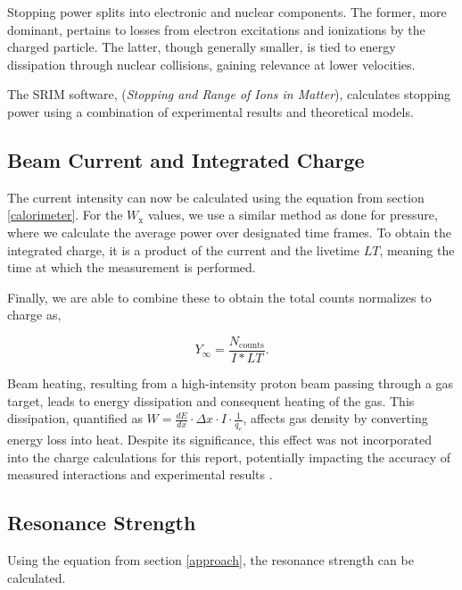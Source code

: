 \documentclass[a4paper,12pt]{article}
\begin{document}
Stopping power splits into electronic and nuclear components. The former, more dominant, pertains to losses from electron excitations and ionizations by the charged particle. The latter, though generally smaller, is tied to energy dissipation through nuclear collisions, gaining relevance at lower velocities.

The SRIM software, (\textit{Stopping and Range of Ions in Matter}), calculates stopping power using a combination of experimental results and theoretical models.


\subsection{Beam Current and Integrated Charge}

The current intensity can now be calculated using the equation from section \ref{calorimeter}.  For the $W_{\text{x}}$ values, we use a similar method as done for pressure, where we calculate the average power over designated time frames.  To obtain the integrated charge, it is a product of the current and the livetime $LT$, meaning the time at which the measurement is performed.  

Finally, we are able to combine these to obtain the total counts normalizes to charge as,

\begin{equation}
    Y_{\infty}=\frac{N_{\text{counts}}}{I*LT}.
\end{equation}

Beam heating, resulting from a high-intensity proton beam passing through a gas target, leads to energy dissipation and consequent heating of the gas. This dissipation, quantified as \(W = \frac{dE}{dx} \cdot \Delta x \cdot I \cdot \frac{1}{q_e}\), affects gas density by converting energy loss into heat. Despite its significance, this effect was not incorporated into the charge calculations for this report, potentially impacting the accuracy of measured interactions and experimental results \cite{GORRES1980295, cavanna2015}.



\subsection{Resonance Strength}

Using the equation from section \ref{approach}, the resonance strength can be calculated.  
\end{document}
